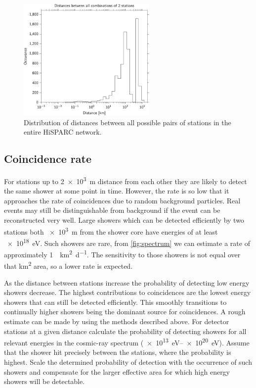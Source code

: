 \begin{figure}
    \centering
    \includegraphics[width=0.6\textwidth]
                    {plots/cluster/network_station_distances}
    \caption{Distribution of distances between all possible pairs of stations in the entire HiSPARC network.}
    \label{fig:network_station_distances}
\end{figure}

\subsection{Coincidence rate}

For stations up to \SI{2e3}{\meter} distance from each other they are likely to detect the same shower at some point in time. However, the rate is so low that it approaches the rate of coincidences due to random background particles. Real events may still be distinguishable from background if the event can be reconstructed very well. Large showers which can be detected efficiently by two stations both \SI{e3}{\meter} from the shower core have energies of at least \SI{e18}{\eV}. Such showers are rare, from \cref{fig:spectrum} we can estimate a rate of approximately \SI{1}{\per\kilo\meter\squared\per\day}. The sensitivity to those showers is not equal over that \si{\kilo\meter\squared} area, so a lower rate is expected.

As the distance between stations increase the probability of detecting low energy showers decrease. The highest contributions to coincidences are the lowest energy showers that can still be detected efficiently. This smoothly transitions to continually higher showers being the dominant source for coincidences. A rough estimate can be made by using the methods described above. For detector stations at a given distance calculate the probability of detecting showers for all relevant energies in the cosmic-ray spectrum (\SIrange{e13}{e20}{\eV}). Assume that the shower hit precisely between the stations, where the probability is highest. Scale the determined probability of detection with the occurrence of such showers and compensate for the larger effective area for which high energy showers will be detectable.

